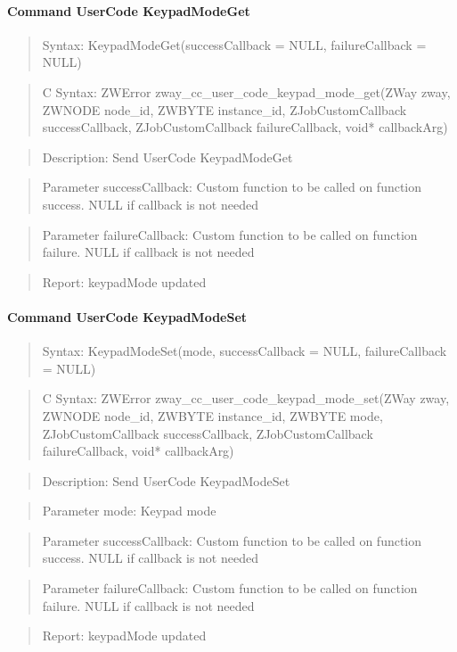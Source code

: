 \paragraph{Command UserCode KeypadModeGet}
\begin{quote}Syntax: KeypadModeGet(successCallback = NULL, failureCallback = NULL)\end{quote}
\begin{quote}C Syntax: ZWError zway\_cc\_user\_code\_keypad\_mode\_get(ZWay zway, ZWNODE node\_id, ZWBYTE instance\_id, ZJobCustomCallback successCallback, ZJobCustomCallback failureCallback, void* callbackArg)\end{quote}
\begin{quote}Description: Send UserCode KeypadModeGet\end{quote}
\begin{quote}Parameter successCallback: Custom function to be called on function success. NULL if callback is not needed\end{quote}
\begin{quote}Parameter failureCallback: Custom function to be called on function failure. NULL if callback is not needed\end{quote}
\begin{quote}Report: keypadMode updated\end{quote}

\paragraph{Command UserCode KeypadModeSet}
\begin{quote}Syntax: KeypadModeSet(mode, successCallback = NULL, failureCallback = NULL)\end{quote}
\begin{quote}C Syntax: ZWError zway\_cc\_user\_code\_keypad\_mode\_set(ZWay zway, ZWNODE node\_id, ZWBYTE instance\_id, ZWBYTE mode, ZJobCustomCallback successCallback, ZJobCustomCallback failureCallback, void* callbackArg)\end{quote}
\begin{quote}Description: Send UserCode KeypadModeSet\end{quote}
\begin{quote}Parameter mode: Keypad mode\end{quote}
\begin{quote}Parameter successCallback: Custom function to be called on function success. NULL if callback is not needed\end{quote}
\begin{quote}Parameter failureCallback: Custom function to be called on function failure. NULL if callback is not needed\end{quote}
\begin{quote}Report: keypadMode updated\end{quote}

